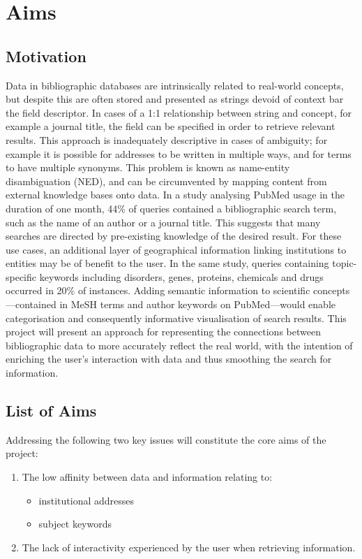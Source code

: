 \documentclass[PROP_AGutteridge_CS.tex]{subfiles}
\begin{document}
\chapter{Aims}
\section{Motivation}
Data in bibliographic databases are intrinsically related to real-world concepts, but despite this are often stored and presented as strings devoid of context bar the field descriptor. In cases of a 1:1 relationship between string and concept, for example a journal title, the field can be specified in order to retrieve relevant results. This approach is inadequately descriptive in cases of ambiguity; for example it is possible for addresses to be written in multiple ways, and for terms to have multiple synonyms. This problem is known as name-entity disambiguation (NED), and can be circumvented by mapping content from external knowledge bases onto data\cite{hoffart}. In a study analysing PubMed usage in the duration of one month, 44\% of queries contained a bibliographic search term, such as the name of an author or a journal title\cite{dogan}. This suggests that many searches are directed by pre-existing knowledge of the desired result. For these use cases, an additional layer of geographical information linking institutions to entities may be of benefit to the user. In the same study, queries containing topic-specific keywords including disorders, genes, proteins, chemicals and drugs occurred in 20\% of instances. Adding semantic information to scientific concepts---contained in MeSH terms and author keywords on PubMed---would enable categorisation and consequently informative visualisation of search results. This project will present an approach for representing the connections between bibliographic data to more accurately reflect the real world, with the intention of enriching the user's interaction with data and thus smoothing the search for information. 

\section{List of Aims}
Addressing the following two key issues will constitute the core aims of the project:
\begin{enumerate}
\item The low affinity between data and information relating to:
	\begin{itemize}
	\item institutional addresses
	\item subject keywords
	\end{itemize}
\item The lack of interactivity experienced by the user when retrieving information.
\end{enumerate}
\end{document}
